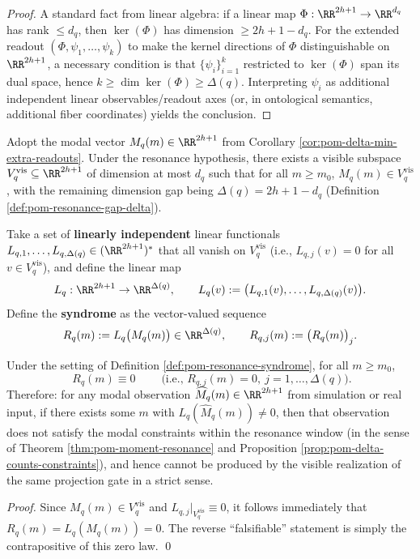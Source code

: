 \begin{proof}
A standard fact from linear algebra: if a linear map \(\Phi:\RR^{2h+1}\to\RR^{d_q}\) has rank \(\le d_q\), then \(\ker(\Phi)\) has dimension \(\ge 2h+1-d_q\).
For the extended readout \((\Phi,\psi_1,\ldots,\psi_k)\) to make the kernel directions of \(\Phi\) distinguishable on \(\RR^{2h+1}\), a necessary condition is
that \(\{\psi_i\}_{i=1}^k\) restricted to \(\ker(\Phi)\) span its dual space, hence \(k\ge \dim\ker(\Phi)\ge \Delta(q)\).
Interpreting \(\psi_i\) as additional independent linear observables/readout axes (or, in ontological semantics, additional fiber coordinates) yields the conclusion.
\end{proof}

\begin{definition}\label{def:pom-resonance-syndrome}
Adopt the modal vector
\(
M_q(m)\in\RR^{2h+1}
\)
from Corollary \ref{cor:pom-delta-min-extra-readouts}.
Under the resonance hypothesis, there exists a visible subspace \(V_q^{\mathrm{vis}}\subseteq\RR^{2h+1}\) of dimension at most \(d_q\) such that for all \(m\ge m_0\), \(M_q(m)\in V_q^{\mathrm{vis}}\), with the remaining dimension gap being \(\Delta(q)=2h+1-d_q\) (Definition \ref{def:pom-resonance-gap-delta}).
\par
Take a set of \textbf{linearly independent} linear functionals \(L_{q,1},\dots,L_{q,\Delta(q)}\in(\RR^{2h+1})^\ast\) that all vanish on \(V_q^{\mathrm{vis}}\) (i.e., \(L_{q,j}(v)=0\) for all \(v\in V_q^{\mathrm{vis}}\)), and define the linear map
\[
L_q:\RR^{2h+1}\to\RR^{\Delta(q)},\qquad
L_q(v):=\bigl(L_{q,1}(v),\dots,L_{q,\Delta(q)}(v)\bigr).
\]
Define the \textbf{syndrome} as the vector-valued sequence
\[
R_q(m):=L_q\bigl(M_q(m)\bigr)\in\RR^{\Delta(q)},
\qquad
R_{q,j}(m):=\bigl(R_q(m)\bigr)_j.
\]
\end{definition}

\begin{corollary}\label{cor:pom-resonance-syndrome-audit}
Under the setting of Definition \ref{def:pom-resonance-syndrome}, for all \(m\ge m_0\),
\[
\boxed{\;R_q(m)\equiv 0\;}
\qquad\text{(i.e., }R_{q,j}(m)=0,\ j=1,\dots,\Delta(q)\text{)}.
\]
Therefore: for any modal observation \(\widehat M_q(m)\in\RR^{2h+1}\) from simulation or real input, if there exists some \(m\) with \(L_q(\widehat M_q(m))\neq 0\), then that observation does not satisfy the modal constraints within the resonance window (in the sense of Theorem \ref{thm:pom-moment-resonance} and Proposition \ref{prop:pom-delta-counts-constraints}), and hence cannot be produced by the visible realization of the same projection gate in a strict sense.
\end{corollary}
\begin{proof}
Since \(M_q(m)\in V_q^{\mathrm{vis}}\) and \(L_{q,j}|_{V_q^{\mathrm{vis}}}\equiv 0\), it follows immediately that \(R_q(m)=L_q(M_q(m))=0\).
The reverse ``falsifiable'' statement is simply the contrapositive of this zero law. \qed
\end{proof}

